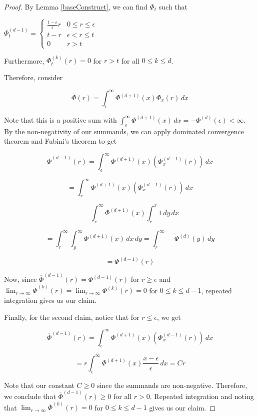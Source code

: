 \begin{proof}
By Lemma \ref{baseConstruct}, we can find $\Phi_t$ such that

$\Phi_t^{(d-1)} = \begin{cases}
\frac{t-\epsilon}{\epsilon } r & 0 \leq r \leq \epsilon \\
t - r & \epsilon < r \leq t \\
0 & r > t
\end{cases}$

Furthermore, $\Phi_t^{(k)}(r) = 0$ for $r > t$ for all $0 \leq k \leq d$.

Therefore, consider 

\[\overline{\Phi}(r) = \int_{\epsilon}^\infty \Phi^{(d+1)}(x) \Phi_x(r) \, dx\] 

Note that this is a positive sum with $\int_{\epsilon}^\infty \Phi^{(d+1)}(x) \, dx = -\Phi^{(d)}(\epsilon) < \infty$. By the non-negativity of our summands, we can apply dominated convergence theorem and Fubini's theorem to get

\[\overline{\Phi}^{(d-1)}(r) = \int_{\epsilon}^\infty  \Phi^{(d+1)}(x) (\Phi_x^{(d-1)}(r)) \, dx\] 

\[ = \int_{r}^\infty  \Phi^{(d+1)}(x) (\Phi_x^{(d-1)}(r)) \, dx\] 

\[ = \int_r^\infty \Phi^{(d+1)}(x) \int_r^x 1 \, dy \,dx \]

\[= \int_r^\infty \int_y^\infty \Phi^{(d+1)}(x) \, dx \, dy = \int_r^\infty  -\Phi^{(d)}(y) \, dy\]

\[ = \Phi^{(d-1)}(r)\]

Now, since $\overline{\Phi}^{(d-1)}(r) = \Phi^{(d-1)}(r)$ for $r\geq \epsilon$ and $\lim_{r\to\infty} \overline{\Phi}^{(k)}(r) = \lim_{r\to\infty} {\Phi}^{(k)}(r) = 0$ for $0 \leq k \leq d-1$, repeated integration gives us our claim. 

Finally, for the second claim, notice that for $r \leq \epsilon$, we get

\[\overline{\Phi}^{(d-1)}(r) = \int_{\epsilon}^\infty  \Phi^{(d+1)}(x) (\Phi_x^{(d-1)}(r)) \, dx\] 

\[ =  r \int_\epsilon^\infty \Phi^{(d+1)}(x) \frac{x - \epsilon}{\epsilon} \, dx = Cr  \]

Note that our constant $C \geq 0$ since the summands are non-negative. Therefore, we conclude that $\overline{\Phi}^{(d-1)}(r) \geq 0$ for all $r > 0$. Repeated integration and noting that $\lim_{r\to\infty} \overline{\Phi}^{(k)}(r) = 0$ for $0 \leq k \leq d-1$ gives us our claim.

\end{proof}

